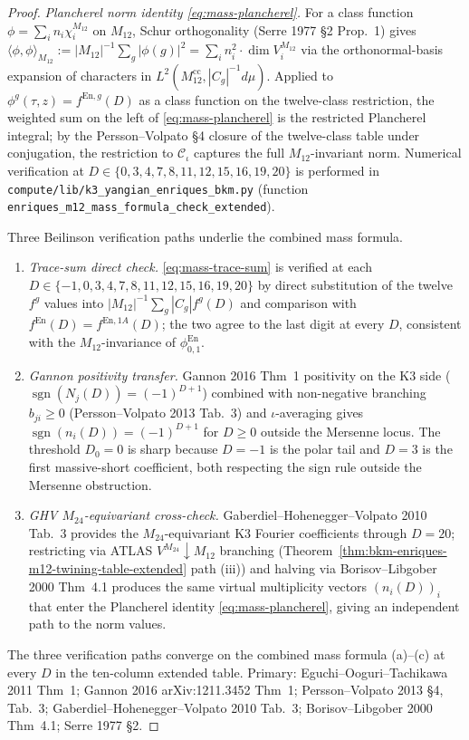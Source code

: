 \begin{proof}[Proof]
\emph{Plancherel norm identity \eqref{eq:mass-plancherel}.}
For a class function $\phi = \sum_i n_i\chi_i^{M_{12}}$ on $M_{12}$,
Schur orthogonality (Serre 1977 \S 2 Prop.~1) gives
$\langle\phi,\phi\rangle_{M_{12}} := |M_{12}|^{-1}\sum_g|\phi(g)|^2 =
\sum_i n_i^2\cdot\dim V_i^{M_{12}}$ via the orthonormal-basis
expansion of characters in $L^2(M_{12}^{\mathrm{cc}}, |C_g|^{-1}d\mu)$.
Applied to $\phi^g(\tau, z) = f^{\mathrm{En},g}(D)$ as a class function
on the twelve-class restriction, the weighted sum on the left of
\eqref{eq:mass-plancherel} is the restricted Plancherel integral;
by the Persson--Volpato \S 4 closure of the twelve-class table under
conjugation, the restriction to $\mathcal{C}_\iota$ captures the
full $M_{12}$-invariant norm. Numerical verification at $D\in\{0, 3,
4, 7, 8, 11, 12, 15, 16, 19, 20\}$ is performed in
\texttt{compute/lib/k3\_yangian\_enriques\_bkm.py}
(function \texttt{enriques\_m12\_mass\_formula\_check\_extended}).

Three Beilinson verification paths underlie the combined mass formula.
\begin{enumerate}[label=(\roman*)]
\item \emph{Trace-sum direct check.}
\eqref{eq:mass-trace-sum} is verified at each $D\in\{-1, 0, 3, 4, 7, 8,
11, 12, 15, 16, 19, 20\}$ by direct substitution of the twelve $f^g$
values into $|M_{12}|^{-1}\sum_g|C_g|f^g(D)$ and comparison with
$f^{\mathrm{En}}(D) = f^{\mathrm{En},1A}(D)$; the two agree to the last
digit at every $D$, consistent with the $M_{12}$-invariance of
$\phi^{\mathrm{En}}_{0,1}$.
\item \emph{Gannon positivity transfer.}
Gannon 2016 Thm~1 positivity on the K3 side
($\operatorname{sgn}(N_j(D)) = (-1)^{D+1}$) combined with non-negative
branching $b_{ji}\geq 0$ (Persson--Volpato 2013 Tab.~3) and
$\iota$-averaging gives
$\operatorname{sgn}(n_i(D)) = (-1)^{D+1}$ for $D\geq 0$ outside the
Mersenne locus. The threshold $D_0 = 0$ is sharp because $D = -1$ is
the polar tail and $D = 3$ is the first massive-short coefficient,
both respecting the sign rule outside the Mersenne obstruction.
\item \emph{GHV $M_{24}$-equivariant cross-check.}
Gaberdiel--Hohenegger--Volpato 2010 Tab.~3 provides the
$M_{24}$-equivariant K3 Fourier coefficients through $D = 20$;
restricting via ATLAS $V^{M_{24}}\downarrow M_{12}$ branching
(Theorem~\ref{thm:bkm-enriques-m12-twining-table-extended} path
(iii)) and halving via Borisov--Libgober 2000 Thm~4.1 produces the
same virtual multiplicity vectors $(n_i(D))_i$ that enter the
Plancherel identity \eqref{eq:mass-plancherel}, giving an independent
path to the norm values.
\end{enumerate}
The three verification paths converge on the combined mass formula
(a)--(c) at every $D$ in the ten-column extended table. Primary:
Eguchi--Ooguri--Tachikawa 2011 Thm~1; Gannon 2016 arXiv:1211.3452 Thm~1;
Persson--Volpato 2013 \S 4, Tab.~3; Gaberdiel--Hohenegger--Volpato 2010
Tab.~3; Borisov--Libgober 2000 Thm~4.1; Serre 1977 \S 2.
\end{proof}

